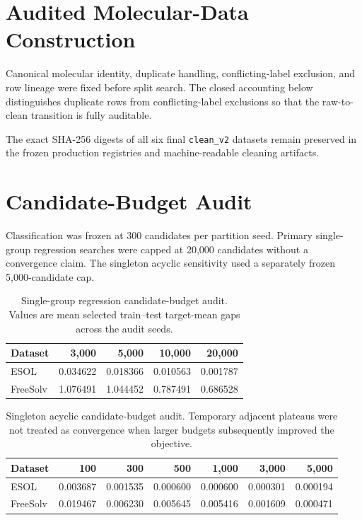 \section{Audited Molecular-Data Construction}
\label{sec:si-cleaning}

Canonical molecular identity, duplicate handling, conflicting-label exclusion, and row lineage were fixed before split search. The closed accounting below distinguishes duplicate rows from conflicting-label exclusions so that the raw-to-clean transition is fully auditable.



The exact SHA-256 digests of all six final \texttt{clean\_v2} datasets remain preserved in the frozen production registries and machine-readable cleaning artifacts.

\section{Candidate-Budget Audit}
\label{sec:si-budget}

Classification was frozen at 300 candidates per partition seed. Primary single-group regression searches were capped at 20,000 candidates without a convergence claim. The singleton acyclic sensitivity used a separately frozen 5,000-candidate cap.

\begin{table}[!htbp]
\centering
\caption{Single-group regression candidate-budget audit. Values are mean selected train--test target-mean gaps across the audit seeds.}
\label{tab:si-budget-single}
\begin{tabular}{lrrrr}
\toprule
Dataset & 3,000 & 5,000 & 10,000 & 20,000 \\
\midrule
ESOL & 0.034622 & 0.018366 & 0.010563 & 0.001787 \\
FreeSolv & 1.076491 & 1.044452 & 0.787491 & 0.686528 \\
\bottomrule
\end{tabular}
\end{table}

\begin{table}[!htbp]
\centering
\caption{Singleton acyclic candidate-budget audit. Temporary adjacent plateaus were not treated as convergence when larger budgets subsequently improved the objective.}
\label{tab:si-budget-singleton}
\begin{tabular}{lrrrrrr}
\toprule
Dataset & 100 & 300 & 500 & 1,000 & 3,000 & 5,000 \\
\midrule
ESOL & 0.003687 & 0.001535 & 0.000600 & 0.000600 & 0.000301 & 0.000194 \\
FreeSolv & 0.019467 & 0.006230 & 0.005645 & 0.005416 & 0.001609 & 0.000471 \\
\bottomrule
\end{tabular}
\end{table}

